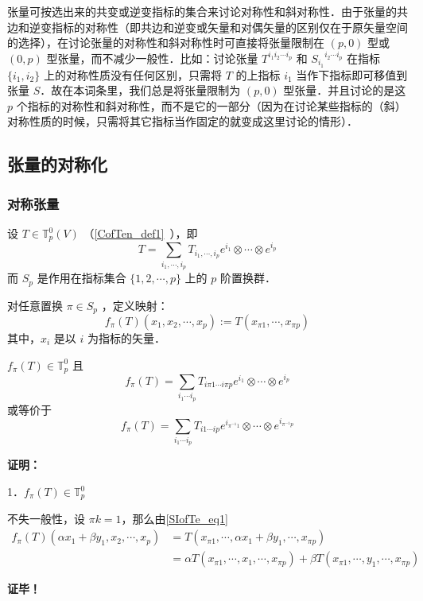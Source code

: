 张量可按选出来的共变或逆变指标的集合来讨论对称性和斜对称性．由于张量的共边和逆变指标的对称性（即共边和逆变或矢量和对偶矢量的区别仅在于原矢量空间的选择），在讨论张量的对称性和斜对称性时可直接将张量限制在 $(p,0)$ 型或 $(0,p)$ 型张量，而不减少一般性．比如：讨论张量 $T^{i_1 i_2\cdots i_p}$ 和 ${S_{i_1}}^{i_2\cdots i_p}$ 在指标 $\{i_1,i_2\}$ 上的对称性质没有任何区别，只需将 $T$ 的上指标 $i_1$ 当作下指标即可移值到张量 $S$．故在本词条里，我们总是将张量限制为 $(p,0)$ 型张量．并且讨论的是这 $p$ 个指标的对称性和斜对称性，而不是它的一部分（因为在讨论某些指标的（斜）对称性质的时候，只需将其它指标当作固定的就变成这里讨论的情形）．
\subsection{张量的对称化}
\subsubsection{对称张量}
设 $T\in \mathbb{T}_p^0(V)$ （\autoref{CofTen_def1}~），即
\begin{equation}
T=\sum_{i_1,\cdots,i_p}T_{i_1,\cdots,i_p}e^{i_1}\otimes\cdots\otimes e^{i_p}
\end{equation}
而 $S_p$ 是作用在指标集合 $\{1,2,\cdots,p\}$ 上的 $p$ 阶置换群．

对任意置换 $\pi\in S_p$ ，定义映射：
\begin{equation}\label{SIofTe_eq1}
f_\pi(T)(x_1,x_2,\cdots,x_p):=T(x_{\pi1},\cdots,x_{\pi p})
\end{equation}
其中，$x_i$ 是以 $i$ 为指标的矢量．

\begin{theorem}{}
$f_{\pi}(T)\in\mathbb{T}_p^0$ 且
\begin{equation}
f_{\pi}(T)=\sum_{i_1\cdots i_p}T_{i\pi1\cdots i\pi p}e^{i_1}\otimes\cdots\otimes e^{i_p}
\end{equation}
或等价于
\begin{equation}
f_{\pi}(T)=\sum_{i_1\cdots i_p}T_{i1\cdots ip}e^{i_{\pi^{-1}1}}\otimes\cdots\otimes e^{i_{\pi^{-1}p}}
\end{equation}
\end{theorem}
\textbf{证明：}

1．$f_\pi(T)\in\mathbb{T}_p^0$

不失一般性，设 $\pi k=1$，那么由\autoref{SIofTe_eq1} 
\begin{equation}
\begin{aligned}
f_\pi(T)(\alpha x_1+\beta y_1,x_2,\cdots,x_p)&=T(x_{\pi1},\cdots,\alpha x_1+\beta y_1,\cdots,x_{\pi p})\\
&=\alpha T(x_{\pi1},\cdots,x_1,\cdots,x_{\pi p})+\beta T(x_{\pi1},\cdots,y_1,\cdots,x_{\pi p})
\end{aligned}
\end{equation}


\textbf{证毕！}